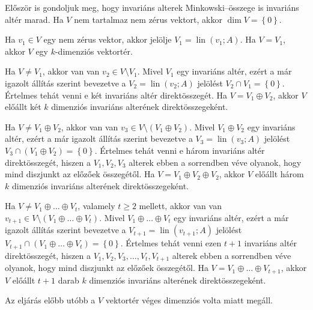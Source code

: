 \documentclass[9pt, a4paper, showtrims]{memoir}
\makeatletter
\renewenvironment{proof}[1][\proofname]
    {\par\pushQED{\qed}%
    \normalfont \topsep6\p@\@plus6\p@\relax
    \trivlist
    \item[\hskip\labelsep
        \itshape
    #1\@addpunct{:}]\ignorespaces}
    {\popQED\endtrivlist\@endpefalse}
\theoremstyle{plain}
\theoremstyle{remark}
\theoremstyle{definition}
\DeclareMathOperator{\lin}{lin}
\makeatother
\begin{document}
    \begin{proof}[Bizonyítás (3.)]
        Először is gondoljuk meg, hogy invariáns alterek Minkowski--összege is invariáns altér marad.
        Ha $V$ nem tartalmaz nem zérus vektort, akkor $\dim V=\left\{ 0 \right\}$.

        Ha $v_1\in V$ egy nem zérus vektor,
        akkor jelölje $V_1=\lin\left( v_1;A \right)$.
        Ha $V=V_1$, 
        akkor $V$ egy $k$-dimenziós vektortér.

        Ha $V\neq V_1$, akkor van van $v_2\in V\setminus V_1$.
        Mivel $V_1$ egy invariáns altér, 
        ezért a már igazolt állítás szerint bevezetve a $V_2=\lin\left( v_2;A \right)$
        jelölést $V_2\cap V_1=\left\{ 0 \right\}$.
        Értelmes tehát venni e két invariáns altér direktösszegét.
        Ha $V=V_1\oplus V_2$, akkor $V$ előállt két $k$ dimenziós invariáns alterének direktösszegeként.

        Ha $V\neq V_1\oplus V_2$, akkor van van $v_3\in V\setminus (V_1\oplus V_2)$.
        Mivel $V_1\oplus V_2$ egy invariáns altér, 
        ezért a már igazolt állítás szerint bevezetve a $V_3=\lin\left( v_3;A \right)$
        jelölést $V_3\cap (V_1\oplus V_2)=\left\{ 0 \right\}$.
        Értelmes tehát venni e három invariáns altér direktösszegét, hiszen
        a $V_1,V_2,V_3$ alterek ebben a sorrendben véve olyanok, 
        hogy mind diszjunkt az előzőek összegétől.
        Ha $V=V_1\oplus V_2\oplus V_2$, 
        akkor $V$ előállt három $k$ dimenziós invariáns alterének direktösszegeként.

        Ha $V\neq V_1\oplus\dots\oplus V_t$, valamely $t\geq 2$ mellett,
        akkor van van $v_{t+1}\in V\setminus (V_1\oplus\dots\oplus V_t)$.
        Mivel $V_1\oplus\dots\oplus V_t$ egy invariáns altér, 
        ezért a már igazolt állítás szerint bevezetve a $V_{t+1}=\lin\left( v_{t+1};A \right)$
        jelölést $V_{t+1}\cap (V_1\oplus\dots\oplus V_t)=\left\{ 0 \right\}$.
        Értelmes tehát venni ezen $t+1$ invariáns altér direktösszegét, hiszen
        a $V_1,V_2,V_3,\dots,V_t,V_{t+1}$ alterek ebben a sorrendben véve olyanok, 
        hogy mind diszjunkt az előzőek összegétől.
        Ha $V=V_1\oplus\dots\oplus V_{t+1}$, 
        akkor $V$ előállt $t+1$ darab $k$ dimenziós invariáns alterének direktösszegeként.

        Az eljárás előbb utóbb a $V$ vektortér véges dimenziós volta miatt megáll.
    \end{proof}
\end{document}
